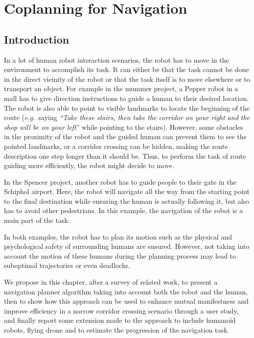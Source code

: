 \documentclass[a4paper,11pt,twoside]{StyleThese}
\begin{document}
\setcounter{chapter}{1} %
\dominitoc
\faketableofcontents
\fi

\chapter{Coplanning for Navigation}
\label{chapter:navigation}
\minitoc

\section{Introduction}
In a lot of human robot interaction scenarios, the robot has to move in the environment to accomplish its task. It can either be that the task cannot be done in the direct vicinity of the robot or that the task itself is to move elsewhere or to transport an object. For example in the \acrshort{mummer} project, a Pepper robot in a mall has to give direction instructions to guide a human to their desired location. The robot is also able to point to visible landmarks to locate the beginning of the route (\textit{e.g.}~saying \textit{``Take these stairs, then take the corridor on your right and the shop will be on your left}'' while pointing to the stairs). However, some obstacles in the proximity of the robot and the guided human can prevent them to see the pointed landmarks, or a corridor crossing can be hidden, making the route description one step longer than it should be. Thus, to perform the task of route guiding more efficiently, the robot might decide to move.

In the Spencer project, another robot has to guide people to their gate in the Schiphol airport. Here, the robot will navigate all the way from the starting point to the final destination while ensuring the human is actually following it, but also has to avoid other pedestrians. In this example, the navigation of the robot is a main part of the task.

In both examples, the robot has to plan its motion such as the physical and psychological safety of surrounding humans are ensured. However, not taking into account the motion of these humans during the planning process may lead to suboptimal trajectories or even deadlocks.

We propose in this chapter, after a survey of related work, to present a navigation planner algorithm taking into account both the robot and the human, then to show how this approach can be used to enhance mutual manifestness and improve efficiency in a narrow corridor crossing scenario through a user study, and finally report some extension made to the approach to include humanoid robots, flying drone and to estimate the progression of the navigation task. 
\end{document}

